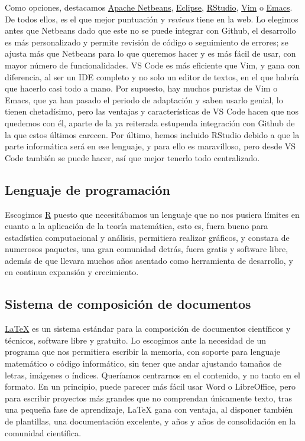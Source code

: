 Como opciones, destacamos \href{https://netbeans.apache.org/}{Apache Netbeans}, 
\href{https://www.eclipse.org/downloads/}{Eclipse}, \href{https://www.rstudio.com/}{RStudio}, \href{https://www.vim.org/}{Vim} o 
\href{https://www.gnu.org/s/emacs/}{Emacs}. De todos ellos, es el que mejor puntuación y \textit{reviews} tiene 
en la web. Lo elegimos antes que Netbeans dado que este no se puede integrar con Github, el desarrollo es más 
personalizado y permite revisión de código o seguimiento de errores; se ajusta más que Netbeans para lo que 
queremos hacer y es más fácil de usar, con mayor número de funcionalidades. VS Code es más eficiente que Vim, y 
gana con diferencia, al ser un IDE completo y no solo un editor de textos, en el que habría que hacerlo casi 
todo a mano. Por supuesto, hay muchos puristas de Vim o Emacs, que ya han pasado el periodo de adaptación y saben 
usarlo genial, lo tienen chetadísimo, pero las ventajas y características de VS Code hacen que nos quedemos 
con él, aparte de la ya reiterada estupenda integración con Github de la que estos últimos carecen. Por último, 
hemos incluido RStudio debido a que la parte informática será en ese lenguaje, y para ello es maravilloso, pero 
desde VS Code también se puede hacer, así que mejor tenerlo todo centralizado.

\subsection{Lenguaje de programación}
Escogimos \href{https://www.r-project.org/}{R} puesto que necesitábamos un lenguaje que no nos pusiera límites 
en cuanto a la aplicación de la teoría matemática, esto es, fuera bueno para estadística computacional y 
análisis, permitiera realizar gráficos, y constara de numerosos paquetes, una gran comunidad detrás, 
fuera gratis y software libre, además de que llevara muchos años asentado como herramienta de desarrollo, y en 
continua expansión y crecimiento.

\subsection{Sistema de composición de documentos}
\href{https://www.latex-project.org/}{LaTeX} es un sistema estándar para la composición de documentos 
científicos y técnicos, software libre y gratuito. Lo escogimos ante la necesidad de un programa que nos 
permitiera escribir la memoria, con soporte para lenguaje matemático o código informático, sin tener que 
andar ajustando tamaños de letras, imágenes o índices. Queríamos centrarnos en el contenido, y no tanto 
en el formato. En un principio, puede parecer más fácil usar Word o LibreOffice, pero para escribir proyectos 
más grandes que no comprendan únicamente texto, tras una pequeña fase de aprendizaje, LaTeX gana con ventaja, 
al disponer también de plantillas, una documentación excelente, y años y años de consolidación en la comunidad 
científica. 

